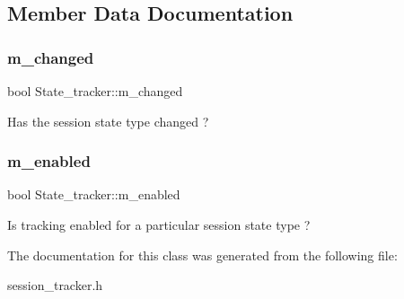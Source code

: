 \subsection{Member Data Documentation}
\mbox{\label{classState__tracker_a398c00ac9a343c4a7b39836708054383}} 
\subsubsection{\texorpdfstring{m\+\_\+changed}{m\_changed}}
{\footnotesize\ttfamily bool State\+\_\+tracker\+::m\+\_\+changed\hspace{0.3cm}{\ttfamily [protected]}}

Has the session state type changed ? \mbox{\label{classState__tracker_a95fd0969d9f32c8daeddfbe1848b2da3}} 
\subsubsection{\texorpdfstring{m\+\_\+enabled}{m\_enabled}}
{\footnotesize\ttfamily bool State\+\_\+tracker\+::m\+\_\+enabled\hspace{0.3cm}{\ttfamily [protected]}}

Is tracking enabled for a particular session state type ? 

The documentation for this class was generated from the following file\+:\begin{DoxyCompactItemize}
\item 
session\+\_\+tracker.\+h\end{DoxyCompactItemize}
